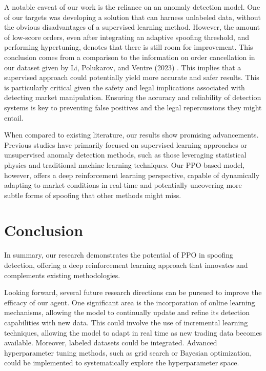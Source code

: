 \documentclass[conference]{IEEEtran}
\begin{document}
\par A notable caveat of our work is the reliance on an anomaly detection model. One of our targets was developing a solution that can harness unlabeled data, without the obvious disadvantages of a supervised learning method. However, the amount of low-score orders, even after integrating an adaptive spoofing threshold, and performing hypertuning, denotes that there is still room for improvement. This conclusion comes from a comparison to the information on order cancellation in our dataset given by Li, Polukarov, and Ventre (2023) \cite{Li_2023}. This implies that a supervised approach could potentially yield more accurate and safer results. This is particularly critical given the safety and legal implications associated with detecting market manipulation. Ensuring the accuracy and reliability of detection systems is key to preventing false positives and the legal repercussions they might entail.

\par When compared to existing literature, our results show promising advancements. Previous studies have primarily focused on supervised learning approaches or unsupervised anomaly detection methods, such as those leveraging statistical physics and traditional machine learning techniques. Our PPO-based model, however, offers a deep reinforcement learning perspective, capable of dynamically adapting to market conditions in real-time and potentially uncovering more subtle forms of spoofing that other methods might miss.

\section{Conclusion}
\par In summary, our research demonstrates the potential of PPO in spoofing detection, offering a deep reinforcement learning approach that innovates and complements existing methodologies. 

\par Looking forward, several future research directions can be pursued to improve the efficacy of our agent. One significant area is the incorporation of online learning mechanisms, allowing the model to continually update and refine its detection capabilities with new data. This could involve the use of incremental learning techniques, allowing the model to adapt in real time as new trading data becomes available. Moreover, labeled datasets could be integrated. Advanced hyperparameter tuning methods, such as grid search or Bayesian optimization, could be implemented to systematically explore the hyperparameter space.
\end{document}

